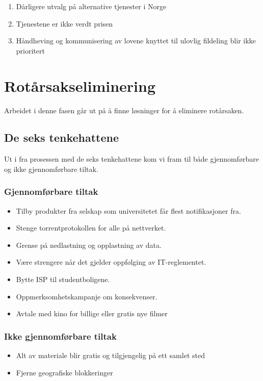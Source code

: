 \begin{enumerate}
    \item Dårligere utvalg på alternative tjenester i Norge
    \item Tjenestene er ikke verdt prisen
    \item Håndheving og kommunisering av lovene knyttet til ulovlig fildeling blir ikke prioritert
\end{enumerate}

\section{Rotårsakseliminering}
Arbeidet i denne fasen går ut på å finne løsninger for å eliminere rotårsaken.

\subsection{De seks tenkehattene}

Ut i fra prosessen med de seks tenkehattene kom vi fram til både gjennomførbare og ikke gjennomførbare tiltak. 
\subsubsection{Gjennomførbare tiltak}
\begin{itemize}
    \item Tilby produkter fra selskap som universitetet får flest notifikasjoner fra.
    \item Stenge torrentprotokollen for alle på nettverket.
    \item Grense på nedlastning og opplastning av data.
    \item Være strengere når det gjelder oppfølging av IT-reglementet. 
    \item Bytte ISP til studentboligene.
    \item Oppmerksomhetskampanje om konsekvenser.
    \item Avtale med kino for billige eller gratis nye filmer
\end{itemize}

\subsubsection{Ikke gjennomførbare tiltak}
\begin{itemize}
    \item Alt av materiale blir gratis og tilgjengelig på ett samlet sted
    \item Fjerne geografiske blokkeringer
\end{itemize}

